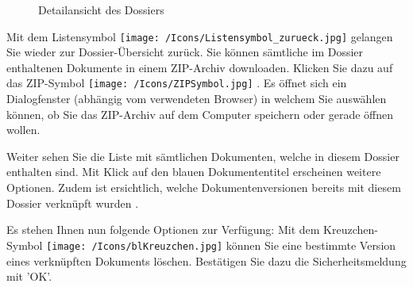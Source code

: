 \begin{figure}[H]
\caption{Detailansicht des Dossiers}
\end{figure}

Mit dem Listensymbol \texttt{[image: /Icons/Listensymbol\_zurueck.jpg]}  gelangen Sie wieder zur Dossier-Übersicht zurück. Sie können sämtliche im Dossier enthaltenen Dokumente in einem ZIP-Archiv downloaden. Klicken Sie dazu auf das ZIP-Symbol \texttt{[image: /Icons/ZIPSymbol.jpg]} . Es öffnet sich ein Dialogfenster (abhängig vom verwendeten Browser) in welchem Sie auswählen können, ob Sie das ZIP-Archiv auf dem Computer speichern oder gerade öffnen wollen. \newline

Weiter sehen Sie die Liste mit sämtlichen Dokumenten, welche in diesem Dossier enthalten sind. Mit Klick auf den blauen Dokumententitel  erscheinen weitere Optionen. Zudem ist ersichtlich, welche Dokumentenversionen bereits mit diesem Dossier verknüpft wurden . \newline

Es stehen Ihnen nun folgende Optionen zur Verfügung:
Mit dem Kreuzchen-Symbol \texttt{[image: /Icons/blKreuzchen.jpg]}  können Sie eine bestimmte Version eines verknüpften Dokuments löschen. Bestätigen Sie dazu die Sicherheitsmeldung mit 'OK'.

\begin{figure}[H]
\end{figure}

